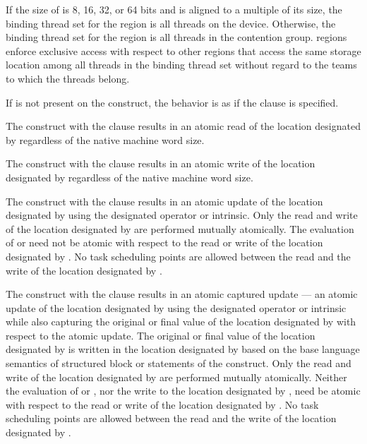 \binding
If the size of  is 8, 16, 32, or 64 bits and  is aligned to a
multiple of its size, the binding thread set for the  region is
all threads on the device. Otherwise, the binding thread set for the
 region is all threads in the contention group.  
regions enforce exclusive access with respect to other  regions
that access the same storage location  among all threads in the
binding thread set without regard to the teams to which the threads belong.

\descr

If  is not present on the construct, the behavior is as if
the  clause is specified.

The  construct with the  clause results in 
an atomic read of the location designated by  regardless of 
the native machine word size.

The  construct with the  clause results in
an atomic write of the location designated by  regardless of 
the native machine word size.

The  construct with the  clause results in 
an atomic update of the location designated by  using the
designated operator or intrinsic.  Only the read and write of the
location designated by  are performed mutually atomically. The
evaluation of  or  need not be atomic with respect to
the read or write of the location designated by . No task scheduling
points are allowed between the read and the write of the location designated
by . 

The  construct with the  clause results in
an atomic captured update --- an atomic update of the location designated 
by  using the designated operator or intrinsic while also capturing 
the original or final value of the location designated by  with 
respect to the atomic update. The original or final value of the
location designated by  is written in the location designated by
  based on the base language semantics of structured block or 
statements of the  construct. Only the read and write
of the location designated by  are performed mutually atomically.
Neither the evaluation of  or , nor the write to the
location designated by , need be atomic with respect to the read or
write of the location designated by . No task scheduling points are
allowed between the read and the write of the location designated by .

